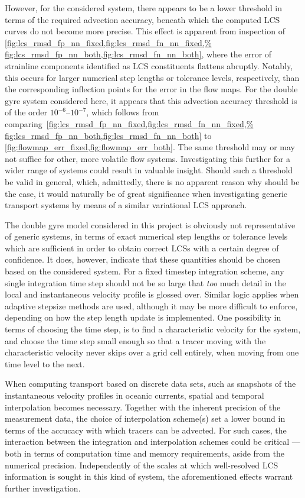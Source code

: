However, for the considered system, there appears to be a lower threshold
in terms of the required advection accuracy, beneath which the computed LCS
curves do not become more precise. This effect is apparent
from inspection of
\cref{fig:lcs_rmsd_fp_nn_fixed,fig:lcs_rmsd_fn_nn_fixed,%
fig:lcs_rmsd_fp_nn_both,fig:lcs_rmsd_fn_nn_both}, where the error of strainline
components identified as LCS constituents flattens abruptly. Notably, this
occurs for larger numerical step lengths or tolerance levels, respectively,
than the corresponding inflection points for the error in the flow maps.
For the double gyre system considered here, it appears that this advection
accuracy threshold is of the order $10^{-6}$--$10^{-7}$, which follows from
comparing~\cref{fig:lcs_rmsd_fp_nn_fixed,fig:lcs_rmsd_fn_nn_fixed,%
fig:lcs_rmsd_fp_nn_both,fig:lcs_rmsd_fn_nn_both} to
\cref{fig:flowmap_err_fixed,fig:flowmap_err_both}. The same threshold may
or may not suffice for other, more volatile flow systems. Investigating
this further for a wider range of systems could result in valuable insight.
Should such a threshold be valid in general, which, admittedly, there is
no apparent reason why should be the case, it would naturally be of great
significance when investigating generic transport systems by means of a
similar variational LCS approach.

The double gyre model considered in this project is obviously not representative
of generic systems, in terms of exact numerical step lengths or tolerance
levels which are sufficient in order to obtain correct LCSs with a certain
degree of confidence. It does, however, indicate that these quantities should
be chosen based on the considered system. For a fixed timestep integration
scheme, any single integration time step should not be so large that \emph{too}
much detail in the local and instantaneous velocity profile is glossed over.
Similar logic applies when adaptive stepsize methods are used, although it
may be more difficult to enforce, depending on how the step length
update is implemented. One possibility in terms of choosing the time step, is to
find a characteristic velocity for the system, and choose the time step small
enough so that a tracer moving with the characteristic velocity never skips over
a grid cell entirely, when moving from one time level to the next.

When computing transport based on discrete data sets, such as snapshots of the
instantaneous velocity profiles in oceanic currents, spatial and temporal
interpolation becomes necessary. Together with the inherent precision of the
measurement data, the choice of interpolation scheme(s) set a lower bound
in terms of the accucacy with which tracers can be advected. For such cases,
the interaction between the integration and interpolation schemes could
be critical --- both in terms of computation time and memory requirements,
aside from the numerical precision. Independently of the scales at which
well-resolved LCS information is sought in this kind of system, the
aforementioned effects warrant further investigation.

